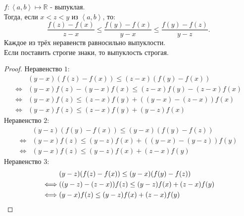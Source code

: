 \documentclass[11pt, oneside]{article}   	%
\begin{document}
\begin{theorem}
    $f: \left<a, b\right> \mapsto \mathbb{R}$ - выпуклая.\\
    Тогда, если $x < z < y$ из $\left<a, b\right>$, то:
    \[ \frac{f(z)-f(x)}{z-x} \le \frac{f(y)-f(x)}{y-x} \le \frac{f(y)-f(z)}{y-z} .\]
    Каждое из трёх неравенств равносильно выпуклости.\\
    Если поставить строгие знаки, то выпуклость строгая.
    \begin{proof}
         Неравенство $1$:
         \begin{equation*}
             \begin{split}
                 &(y-x)(f(z)-f(x)) \le (z-x)(f(y)-f(x))\\
                 \iff &(y-x)f(z) - (y-x)f(x) \le (z-x)f(y)-(z-x)f(x)\\
                 \iff &(y-x)f(z) \le (z-x)f(y) + ((y-x)-(z-x))f(x)\\
                 \iff &(y-x)f(z) \le (z-x)f(y) + (y-z)f(x)
             \end{split}
         \end{equation*}
         Неравенство $2$:
         \begin{equation*}
             \begin{split}
                 &(y-z)(f(y)-f(x)) \le (y-x)(f(y)-f(z))\\
                 \iff &(y-x)f(z) \le (y-z)f(x)+((y-x)-(y-z))f(y)\\
                 \iff &(y-x)f(z) \le (y-z)f(x) + (z-x)f(y)
             \end{split}
         \end{equation*}
         Неравенство $3$:
         \begin{equation*}
             \begin{split}
                 &(y-z)(f(z)-f(x)) \le (y-x)(f(y)-f(z))\\
                 \iff &((y-z)-(z-x))f(z) \le (y-z)f(x) + (z-x)f(y)\\
                 \iff &(y-x)f(z) \le (y-z)f(x)+(z-x)f(y) \qedhere
             \end{split}
         \end{equation*}
    \end{proof}
\end{theorem}
\end{document}

